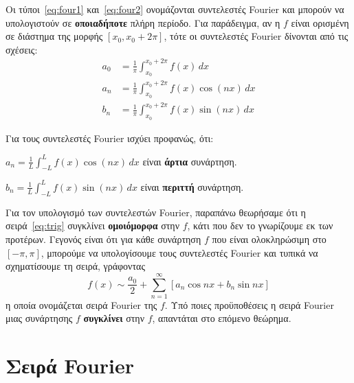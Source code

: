 \begin{rem}
  Οι τύποι~\eqref{eq:four1} και~\eqref{eq:four2} ονομάζονται 
  \textcolor{Col1}{συντελεστές Fourier} και μπορούν να υπολογιστούν σε 
  \textbf{οποιαδήποτε} πλήρη περίοδο.  Για παράδειγμα, αν η $f$ είναι ορισμένη σε 
  διάστημα της μορφής $ [x_{0}, x_{0}+2 \pi] $, τότε οι συντελεστές 
  Fourier δίνονται από τις σχέσεις:
  \begin{align*}
    a_{0} &= \frac{1}{\pi} \int _{x_{0}}^{x_{0}+ 2 \pi }f(x) \,{dx} \\
    a_{n} &= \frac{1}{\pi} \int _{x_{0}}^{x_{0}+ 2 \pi } f(x) \cos{(nx)} \,{dx}  \\
    b_{n} &= \frac{1}{\pi} \int _{x_{0}}^{x_{0}+ 2 \pi } f(x) \sin{(nx)} \,{dx}  
  \end{align*} 
\end{rem}

\begin{rem}
  Για τους συντελεστές Fourier ισχύει προφανώς, ότι:
  \begin{myitemize}
    \item $ a_{n} = \frac{1}{L} \int _{-L}^{L} f(x) \cos{(nx)} \,{dx} $ είναι
      \textbf{άρτια} συνάρτηση.
    \item $ b_{n} = \frac{1}{L} \int _{-L}^{L} f(x) \sin{(nx)} \,{dx} $ είναι
      \textbf{περιττή} συνάρτηση.
  \end{myitemize}
\end{rem}

\begin{rem}
  Για τον υπολογισμό των συντελεστών Fourier, παραπάνω θεωρήσαμε ότι η 
  σειρά~\eqref{eq:trig} συγκλίνει \textbf{ομοιόμορφα} στην $f$, κάτι που δεν το 
  γνωρίζουμε εκ των προτέρων.  Γεγονός είναι ότι για κάθε συνάρτηση $f$ που είναι 
  ολοκληρώσιμη στο $ [- \pi , \pi] $, μπορούμε να υπολογίσουμε τους συντελεστές 
  Fourier και τυπικά να σχηματίσουμε τη σειρά, γράφοντας
  \[
    f(x) \sim \frac{a_{0}}{2} + \sum_{n=1}^{\infty} [a_{n} \cos{nx} + b_{n} \sin{nx}]
  \] 
  η οποία ονομάζεται σειρά \textcolor{Col1}{Fourier} της $f$. Υπό ποιες προϋποθέσεις η 
  σειρά Fourier μιας συνάρτησης $f$ \textbf{συγκλίνει} στην $f$, απαντάται στο επόμενο 
  θεώρημα.
\end{rem}



\section{Σειρά Fourier}

